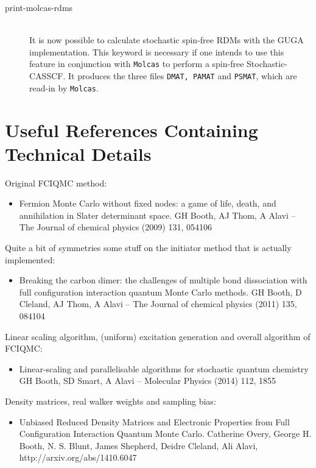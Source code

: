 \documentclass[a4paper,notitlepage,dvipsnames]{scrreprt}
\newcommand\codeitem[1]{\needspace{1.5\baselineskip}\item[\textnormal{\ttfamily #1 \nopagebreak}] \hfill \\ \nopagebreak}
\begin{document}
\begin{description}
     \codeitem{print-molcas-rdms}
     	It is now possible to calculate stochastic spin-free RDMs with the GUGA implementation. This keyword is necessary if one intends to use this feature in conjunction with \texttt{Molcas} to perform a spin-free Stochastic-CASSCF. It produces the three files \texttt{DMAT, PAMAT} and \texttt{PSMAT}, which are read-in by \texttt{Molcas}.
    \end{description}

\section{Useful References Containing Technical Details}

Original FCIQMC method:
\begin{itemize}
\item Fermion Monte Carlo without fixed nodes: a game of life, death, and annihilation in Slater determinant space. \newline
GH Booth, AJ Thom, A Alavi – The Journal of chemical physics (2009) 131, 054106
\end{itemize}

Quite a bit of symmetries some stuff on the initiator method that is actually implemented:
\begin{itemize}
\item Breaking the carbon dimer: the challenges of multiple bond dissociation with full configuration interaction quantum Monte Carlo methods.
GH Booth, D Cleland, AJ Thom, A Alavi – The Journal of chemical physics (2011) 135, 084104
\end{itemize}

Linear scaling algorithm, (uniform) excitation generation and overall algorithm of FCIQMC:
\begin{itemize}
\item Linear-scaling and parallelisable algorithms for stochastic quantum chemistry
GH Booth, SD Smart, A Alavi – Molecular Physics (2014) 112, 1855
\end{itemize}

Density matrices, real walker weights and sampling bias:
\begin{itemize}
\item Unbiased Reduced Density Matrices and Electronic Properties from Full Configuration Interaction Quantum Monte Carlo.
Catherine Overy, George H. Booth, N. S. Blunt, James Shepherd, Deidre Cleland, Ali Alavi, http://arxiv.org/abs/1410.6047
\end{itemize}
\end{document}
